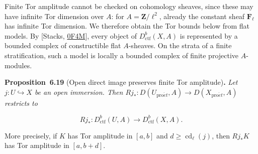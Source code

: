 \documentclass[11pt]{article}
\newenvironment{bpstatement}[2]{\par\addvspace{0.6\baselineskip}\noindent\textbf{#1}#2\textbf{.}\enspace\ignorespaces}
  {\par\addvspace{0.4\baselineskip}}
\newenvironment{bpstatementit}[2]{\begin{bpstatement}{#1}{#2}\itshape\ignorespaces}{\end{bpstatement}}
\begin{document}
Finite Tor amplitude cannot be checked on cohomology sheaves, since these may have infinite Tor dimension over \(A\): for \(A=\mathbf Z/\ell^2\), already the constant sheaf \(\mathbf F_\ell\) has infinite Tor dimension. We therefore obtain the Tor bounds below from flat models. By [Stacks, \href{https://stacks.math.columbia.edu/tag/0F4M}{0F4M}], every object of \(D^b_{\mathrm{ctf}}(X,A)\) is represented by a bounded complex of constructible flat \(A\)-sheaves. On the strata of a finite stratification, such a model is locally a bounded complex of finite projective \(A\)-modules.

\label{bp570}%
\begin{bpstatementit}{Proposition~6.19}{ (Open direct image preserves finite Tor amplitude)}
Let \(j:U\hookrightarrow X\) be an open immersion. Then \(Rj_*:D(U_{\mathrm{pro}\acute{e}t},A)\to D(X_{\mathrm{pro}\acute{e}t},A)\) restricts to

\[
Rj_*:D^b_{\mathrm{ctf}}(U,A)\longrightarrow D^b_{\mathrm{ctf}}(X,A).
\]

More precisely, if \(K\) has Tor amplitude in \([a,b]\) and \(d\ge
\operatorname{cd}_\ell(j)\), then \(Rj_*K\) has Tor amplitude in \([a,b+d]\).
\end{bpstatementit}
\end{document}
